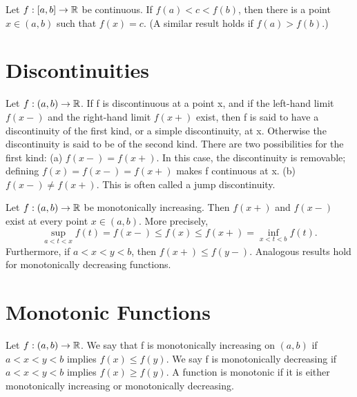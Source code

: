 \begin{theorem} %
  \label{thm:chap4:intermediate_value_thm}
  Let $f: [a, b] \to \mathbb{R}$ be continuous. If $f(a) < c < f(b)$, then
  there is a point $x \in (a, b)$ such that $f(x) = c$. (A similar
  result holds if $f(a) > f(b)$.)
\end{theorem}

\section{Discontinuities}
\label{sec:chap4:discontinuities}

\begin{definition} %
  \label{def:chap4:discontinuity_types}
  Let $f: (a, b) \to \mathbb{R}$. If f is discontinuous at a point x, and
  if the left-hand limit $f(x-)$ and the right-hand limit $f(x+)$
  exist, then f is said to have a discontinuity of the first kind, or
  a simple discontinuity, at x. Otherwise the discontinuity is said
  to be of the second kind.
  There are two possibilities for the first kind:
  (a) $f(x-) = f(x+)$. In this case, the discontinuity is removable;
  defining $f(x) = f(x-) = f(x+)$ makes f continuous at x.
  (b) $f(x-) \ne f(x+)$. This is often called a jump discontinuity.
\end{definition}

\begin{theorem} %
  \label{thm:chap4:monotonic_discont_limits}
  Let $f: (a, b) \to \mathbb{R}$ be monotonically increasing. Then $f(x+)$
  and $f(x-)$ exist at every point $x \in (a, b)$. More precisely,
  \[ \sup_{a<t<x} f(t) = f(x-) \le f(x) \le f(x+) = \inf_{x<t<b} f(t). \]
  Furthermore, if $a < x < y < b$, then $f(x+) \le f(y-)$.
  Analogous results hold for monotonically decreasing functions.
\end{theorem}

\section{Monotonic Functions}
\label{sec:chap4:monotonic_functions}

\begin{definition} %
  \label{def:chap4:monotonic_function}
  Let $f: (a, b) \to \mathbb{R}$. We say that f is monotonically
  increasing on $(a, b)$ if $a < x < y < b$ implies $f(x) \le f(y)$.
  We say f is monotonically decreasing if $a < x < y < b$ implies
  $f(x) \ge f(y)$. A function is monotonic if it is either
  monotonically increasing or monotonically decreasing.
\end{definition}

